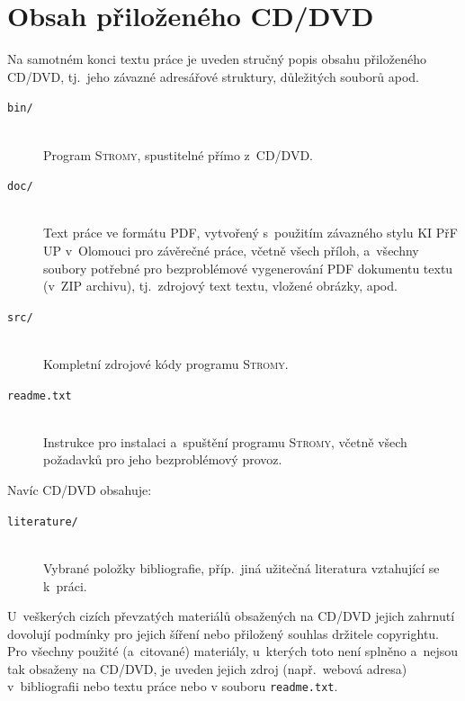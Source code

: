 \documentclass[
  biblatex=false,
  font=serif,
  glossaries=false,
  tables=false,
  theorems=false,
  index
]{kidiplom}
\begin{document}

\section{Obsah přiloženého CD/DVD} \label{sec:ObsahCD}

Na samotném konci textu práce je uveden stručný popis obsahu
přiloženého CD/DVD, tj.~jeho závazné adresářové struktury, důležitých
souborů apod.

\begin{description}

\item[\texttt{bin/}] \hfill \\
  Program \textsc{Stromy}, spustitelné přímo z~CD/DVD. 

\item[\texttt{doc/}] \hfill \\
  Text práce ve formátu PDF, vytvořený s~použitím závazného stylu KI
  PřF UP v~Olomouci pro závěrečné práce, včetně všech příloh,
  a~všechny soubory potřebné pro bezproblémové vygenerování PDF
  dokumentu textu (v~ZIP archivu), tj.~zdrojový text textu, vložené
  obrázky, apod.

\item[\texttt{src/}] \hfill \\
  Kompletní zdrojové kódy programu \textsc{Stromy}.

\item[\texttt{readme.txt}] \hfill \\
  Instrukce pro instalaci a~spuštění programu \textsc{Stromy}, včetně
  všech požadavků pro jeho bezproblémový provoz.

\end{description}

Navíc CD/DVD obsahuje:

\begin{description}
\item[\texttt{literature/}] \hfill \\
  Vybrané položky bibliografie, příp.~jiná užitečná literatura
  vztahující se k~práci.
\end{description}

U~veškerých cizích převzatých materiálů obsažených na CD/DVD jejich
zahrnutí dovolují podmínky pro jejich šíření nebo přiložený souhlas
držitele copyrightu. Pro všechny použité (a~citované) materiály,
u~kterých toto není splněno a~nejsou tak obsaženy na CD/DVD, je uveden
jejich zdroj (např.~webová adresa) v~bibliografii nebo textu práce
nebo v souboru \texttt{readme.txt}.
\end{document}
